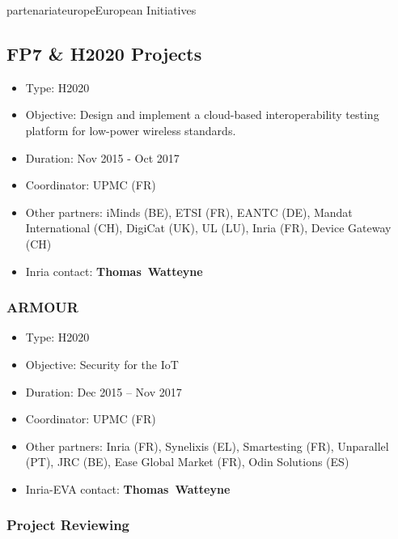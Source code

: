 \documentclass{ra2016}
\newcommand{\thomas}           {\textbf{Thomas~Watteyne}}
\begin{document}
\begin{module}{partenariat}{europe}{European Initiatives}


\subsection{FP7 \& H2020 Projects}
\begin{itemize}
    \item Type: H2020
    \item Objective: Design and implement a cloud-based interoperability testing platform for low-power wireless standards.
    \item Duration: Nov 2015 - Oct 2017
    \item Coordinator: UPMC (FR)
    \item Other partners: iMinds (BE), ETSI (FR), EANTC (DE), Mandat International (CH), DigiCat (UK), UL (LU), Inria (FR), Device Gateway (CH)
    \item Inria contact: \thomas
\end{itemize}

\subsubsection{ARMOUR}

\begin{itemize}
    \item Type: H2020
    \item Objective: Security for the IoT
    \item Duration: Dec 2015 – Nov 2017
    \item Coordinator: UPMC (FR)
    \item Other partners: Inria (FR), Synelixis (EL), Smartesting (FR), Unparallel (PT), JRC (BE), Ease Global Market (FR), Odin Solutions (ES)
    \item Inria-EVA contact: \thomas
\end{itemize}

%
\subsubsection{Project Reviewing} 


\end{module}
\end{document}
